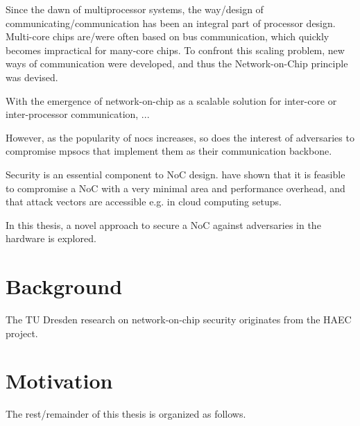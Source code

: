 Since the dawn of multiprocessor systems, the way/design of communicating/communication has been an integral part of processor design.
Multi-core chips are/were often based on bus communication, which quickly becomes impractical for many-core chips.
To confront this scaling problem, new ways of communication were developed, and thus the Network-on-Chip principle was devised.

With the emergence of network-on-chip as a scalable solution for inter-core or inter-processor communication, ...

However, as the popularity of \glspl{noc} increases, so does the interest of adversaries to compromise \glspl{mpsoc} that implement them as their communication
backbone.

Security is an essential component to NoC design. \citeauthor{ancajas14fortnocs} have shown that it is feasible to compromise a NoC with a very
minimal area and performance overhead, and that attack vectors are accessible e.g. in cloud computing setups. \cite{ancajas14fortnocs}

In this thesis, a novel approach to secure a NoC against adversaries in the hardware is explored.

\section{Background}\label{sec:background}
The TU Dresden research on network-on-chip security originates from the HAEC project.

\section{Motivation}\label{sec:motivation}

The rest/remainder of this thesis is organized as follows.
